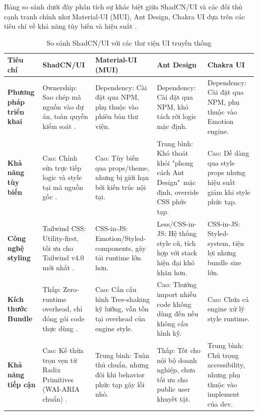 Bảng so sánh dưới đây phân tích sự khác biệt giữa ShadCN/UI và các đối thủ cạnh tranh chính như Material-UI (MUI), Ant Design, Chakra UI dựa trên các tiêu chí về khả năng tùy biến và hiệu suất \cite{kitemetric2025, ui_comparison_2025}.

\clearpage
\begin{landscape}
\begin{table}[h!]
\centering
\setlength{\tabcolsep}{4pt} 
\footnotesize 
\renewcommand{\arraystretch}{1.4}
\begin{tabularx}{\linewidth}{|l|X|X|X|X|}
\hline
\textbf{Tiêu chí} & \textbf{ShadCN/UI} & \textbf{Material-UI (MUI)} & \textbf{Ant Design} & \textbf{Chakra UI} \\
\hline
\textbf{Phương pháp triển khai} & 
Ownership: Sao chép mã nguồn vào dự án, toàn quyền kiểm soát \cite{shadcn_docs}. & 
Dependency: Cài đặt qua NPM, phụ thuộc vào phiên bản thư viện. & 
Dependency: Cài đặt qua NPM, khó tách rời logic mặc định. & 
Dependency: Cài đặt qua NPM, phụ thuộc vào Emotion engine. \\
\hline
\textbf{Khả năng tùy biến} & 
Cao: Chỉnh sửa trực tiếp logic và style tại mã nguồn gốc \cite{fabrizio2025}. & 
Cao: Tùy biến qua props/theme, nhưng bị giới hạn bởi kiến trúc nội tại. & 
Trung bình: Khó thoát khỏi "phong cách Ant Design"\ mặc định, override CSS phức tạp. & 
Cao: Dễ dàng qua style props nhưng hiệu suất giảm khi style phức tạp. \\
\hline
\textbf{Công nghệ styling} & 
Tailwind CSS: Utility-first, tối ưu cho Tailwind v4.0 mới nhất \cite{tailwind_v4}. & 
CSS-in-JS: Emotion/Styled-components, gây tải runtime lớn hơn. & 
Less/CSS-in-JS: Hệ thống style cũ, tích hợp với stack hiện đại khó khăn hơn. & 
CSS-in-JS: Styled-system, tiện lợi nhưng bundle size lớn. \\
\hline
\textbf{Kích thước Bundle} & 
Thấp: Zero-runtime overhead, chỉ đóng gói code thực dùng \cite{kitemetric2025}. & 
Cao: Cần cấu hình Tree-shaking kỹ lưỡng, vẫn tồn tại overhead của engine style. & 
Cao: Thường import nhiều code không dùng đến nếu không cấu hình kỹ. & 
Cao: Chứa cả engine xử lý style runtime. \\
\hline
\textbf{Khả năng tiếp cận} & 
Cao: Kế thừa trọn vẹn từ Radix Primitives (WAI-ARIA chuẩn) \cite{radix_accessibility}. & 
Trung bình: Tuân thủ chuẩn, nhưng đôi khi behavior phức tạp gây lỗi nhỏ. & 
Thấp: Tốt cho nội bộ doanh nghiệp, chưa tối ưu cho public user khuyết tật. & 
Trung bình: Chú trọng accessibility, nhưng phụ thuộc vào implement của dev. \\
\hline
\end{tabularx}
\caption{So sánh ShadCN/UI với các thư viện UI truyền thống}
\end{table}
\end{landscape}
